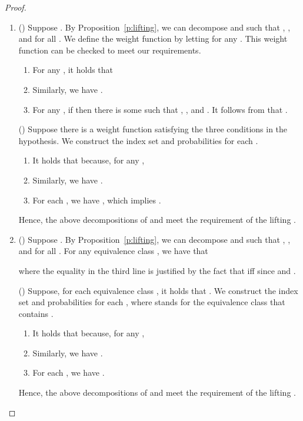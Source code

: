 \documentclass{article}
\begin{document}
\begin{proof}
\begin{enumerate}
\item
() Suppose . By
Proposition~\ref{p:lifting}, we can decompose  and 
such that ,
, and  for
all . We define the weight function  by letting
 for any . This weight function can be checked to meet our
requirements.
\begin{enumerate}
\item For any , it holds that

\item Similarly, we have .
\item For any , if  then there is some  such that , , and . It follows from
 that .
\end{enumerate}

() Suppose there is a weight function  satisfying the
three conditions in the hypothesis. We construct the index set
 and probabilities
 for each .
\begin{enumerate}
\item It holds that 
because, for any ,

\item Similarly, we have .
\item For each , we have , which implies .
\end{enumerate}
Hence, the above decompositions of  and  meet the
requirement of the lifting .

\item
() Suppose . By
Proposition~\ref{p:lifting}, we can decompose  and 
such that ,
, and  for
all . For any equivalence class , we have
that

where the equality in the third line is justified by the fact that
 iff  since  and .

() Suppose, for each equivalence class , it holds that . We construct the index set
 and
probabilities
 for each
, where  stands for the equivalence class
that contains .
\begin{enumerate}
\item It holds that 
because, for any ,

\item Similarly, we have .
\item For each , we have .
\end{enumerate}
Hence, the above decompositions of  and  meet the
requirement of the lifting .
\end{enumerate}
\end{proof}
\end{document}
